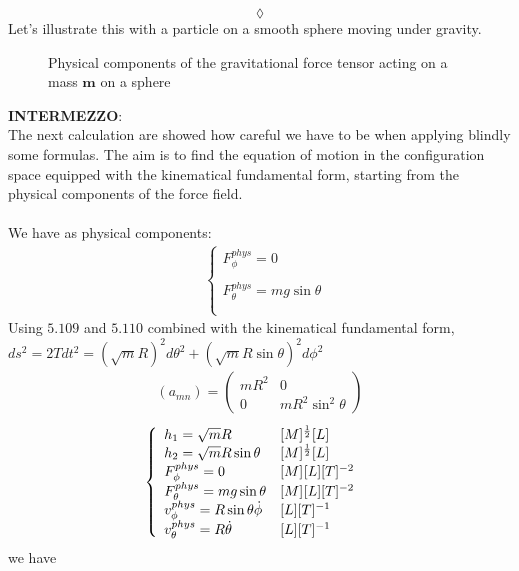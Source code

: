 $$\lozenge$$
Let's illustrate this with a particle on a smooth sphere moving under gravity.
\begin{figure}[H]

\caption{Physical components of the gravitational force tensor acting on a mass $\mathbf{m}$ on a sphere }
\label{fig:fig_p186_Ex2}
\end{figure}
\textbf{INTERMEZZO}:\\
The next calculation are showed how careful we have to be when applying blindly some formulas. The aim is to find the equation of motion in the configuration space equipped with the kinematical fundamental form, starting from the physical components of the force field.\\\\
We have as physical components:
\begin{align}
&\left\{\begin{array}{l}
F_{\phi}^{phys}= 0\\\\
F_{\theta}^{phys}= mg\sin{\theta}\\\\
\end{array}\right.
\end{align}
Using $\mathbf{5.109}$ and $\mathbf{5.110}$ combined with the kinematical fundamental form, $ds^2= 2Tdt^2 = \left(\sqrt{m}R\right)^2d\theta^2 + \left(\sqrt{m}R\sin\theta\right)^2d\phi^2 $
\begin{align}
(a_{mn}) = \left(\begin{matrix}
mR^2&0\\
0&mR^2\sin^2\theta
\end{matrix}\right)
\end{align}
\begin{align}
&\left\{\begin{array}{ll}
h_1 = \sqrt{m}R&[M]^{\frac{1}{2}}[L]\\
h_2 = \sqrt{m}R\sin\theta&[M]^{\frac{1}{2}}[L]\\
F_{\phi}^{phys}= 0&[M]^{}[L][T]^{-2}\\
F_{\theta}^{phys}= mg\sin{\theta}&[M]^{}[L][T]^{-2}\\
v_{\phi}^{phys}= R\sin\theta \dot{\phi}&[L][T]^{-1}\\
v_{\theta}^{phys}= R \dot{\theta}&[L][T]^{-1}\\
\end{array}\right.
\end{align}
we have 
